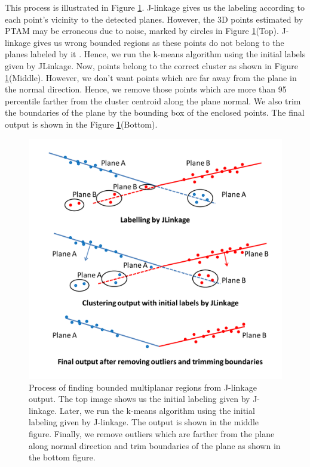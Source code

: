 This process is illustrated in Figure \ref{fig:multiplane}. J-linkage
gives us the labeling according to each point's vicinity to the detected
planes. However, the 3D points estimated by PTAM may be erroneous due to noise,
marked by circles in Figure \ref{fig:multiplane}(Top). J-linkage gives us wrong bounded
regions as these points do not belong to the planes labeled by it . Hence, we
run the k-means algorithm using the initial labels given by JLinkage. Now, points  
belong to the correct cluster as shown in Figure \ref{fig:multiplane}(Middle). 
However, we don't want points which are far away from the plane in the normal direction.
Hence, we remove those points which are more than 95 percentile farther from the cluster 
centroid along the plane normal. We also trim the boundaries of the plane by the bounding box of the
enclosed points. The final output is shown in the Figure \ref{fig:multiplane}(Bottom).

\begin{figure}[h!]
\centering
\includegraphics[width=\linewidth]{figures/multiplanar/multiplaneDetection}
\caption{Process of finding bounded multiplanar regions from J-linkage output.
The top image shows us the initial labeling given by J-linkage. Later, we run
the k-means algorithm using the initial labeling given by J-linkage. The output
is shown in the middle figure. Finally, we remove outliers which are farther from the
plane along normal direction and trim boundaries of the plane as shown in
the bottom figure.}
\label{fig:multiplane}
\end{figure}

